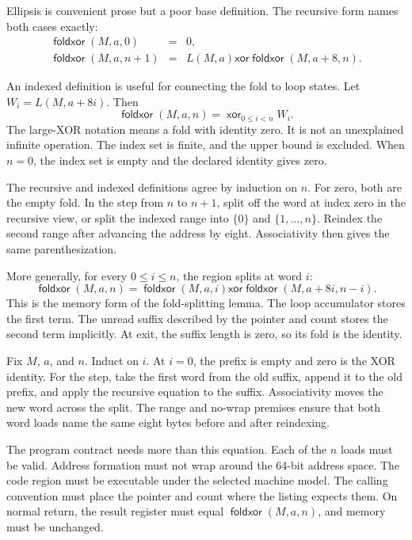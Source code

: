 Ellipsis is convenient prose but a poor base definition. The recursive form
names both cases exactly:
\[
 \begin{array}{rcl}
 \mathop{\mathsf{foldxor}}(M,a,0)&=&0,\\
\mathop{\mathsf{foldxor}}(M,a,n+1)&=&
   L(M,a)\mathbin{\mathsf{xor}}
   \mathop{\mathsf{foldxor}}(M,a+8,n).
 \end{array}
\]

An indexed definition is useful for connecting the fold to loop states. Let
\(W_i=L(M,a+8i)\). Then
\[
  \mathop{\mathsf{foldxor}}(M,a,n)
  =\mathop{\mathsf{xor}}_{0\le i<n} W_i.
\]
The large-XOR notation means a fold with identity zero. It is not an
unexplained infinite operation. The index set is finite, and the upper bound
is excluded. When \(n=0\), the index set is empty and the declared identity
gives zero.

The recursive and indexed definitions agree by induction on \(n\). For zero,
both are the empty fold. In the step from \(n\) to \(n+1\), split off the word
at index zero in the recursive view, or split the indexed range into
\(\{0\}\) and \(\{1,\ldots,n\}\). Reindex the second range after advancing
the address by eight. Associativity then gives the same parenthesization.

More generally, for every \(0\le i\le n\), the region splits at word \(i\):
\[
 \mathop{\mathsf{foldxor}}(M,a,n)
 =\mathop{\mathsf{foldxor}}(M,a,i)
  \mathbin{\mathsf{xor}}
  \mathop{\mathsf{foldxor}}(M,a+8i,n-i).
\]
This is the memory form of the fold-splitting lemma. The loop accumulator
stores the first term. The unread suffix described by the pointer and count
stores the second term implicitly. At exit, the suffix length is zero, so its
fold is the identity.

\begin{proofkit}[title={Prove the memory split without ellipsis}]
Fix \(M\), \(a\), and \(n\). Induct on \(i\). At \(i=0\), the prefix is
empty and zero is the XOR identity. For the step, take the first word from the
old suffix, append it to the old prefix, and apply the recursive equation to
the suffix. Associativity moves the new word across the split. The range and
no-wrap premises ensure that both word loads name the same eight bytes before
and after reindexing.
\end{proofkit}

The program contract needs more than this equation. Each of the \(n\) loads
must be valid. Address formation must not wrap around the 64-bit address
space. The code region must be executable under the selected machine model.
The calling convention must place the pointer and count where the listing
expects them. On normal return, the result register must equal
\(\mathop{\mathsf{foldxor}}(M,a,n)\), and memory must be unchanged.

